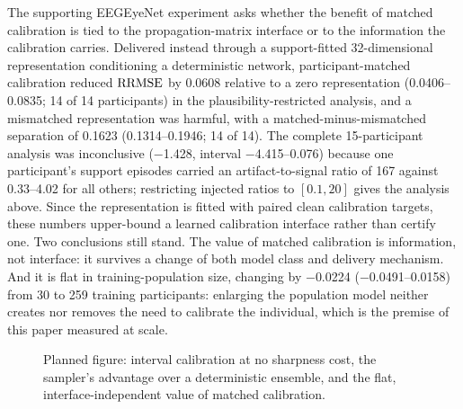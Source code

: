 The supporting EEGEyeNet experiment asks whether the benefit of matched calibration is tied to the propagation-matrix interface or to the information the calibration carries. Delivered instead through a support-fitted 32-dimensional representation conditioning a deterministic network, participant-matched calibration reduced $\mathrm{RRMSE}$ by 0.0608 relative to a zero representation (0.0406--0.0835; 14 of 14 participants) in the plausibility-restricted analysis, and a mismatched representation was harmful, with a matched-minus-mismatched separation of 0.1623 (0.1314--0.1946; 14 of 14). The complete 15-participant analysis was inconclusive ($-$1.428, interval $-$4.415--0.076) because one participant's support episodes carried an artifact-to-signal ratio of 167 against 0.33--4.02 for all others; restricting injected ratios to $[0.1,20]$ gives the analysis above. Since the representation is fitted with paired clean calibration targets, these numbers upper-bound a learned calibration interface rather than certify one. Two conclusions still stand. The value of matched calibration is information, not interface: it survives a change of both model class and delivery mechanism. And it is flat in training-population size, changing by $-$0.0224 ($-$0.0491--0.0158) from 30 to 259 training participants: enlarging the population model neither creates nor removes the need to calibrate the individual, which is the premise of this paper measured at scale.

\begin{figure}[t]
  \centering
  \caption{Planned figure: interval calibration at no sharpness cost, the sampler's advantage over a deterministic ensemble, and the flat, interface-independent value of matched calibration.}
  \label{fig:uq}
\end{figure}
